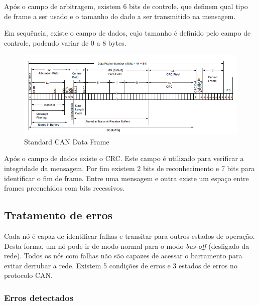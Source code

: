 Após o campo de arbitragem, existem 6 bits de controle, que definem qual tipo de frame a ser usado e o tamanho do dado a ser transmitido na mensagem. 

Em sequência, existe o campo de dados, cujo tamanho é definido pelo campo de controle, podendo variar de 0 a 8 bytes. 

\begin{figure}[H]
\centering
\includegraphics[width=\textwidth]{imagens/DataFrame}
\caption{Standard CAN Data Frame \cite{cip3}}
\label{im::candataframe}
\end{figure}

Após o campo de dados existe o CRC. Este campo é utilizado para verificar a integridade da mensagem. Por fim existem 2 bits de reconhecimento e 7 bits para identificar o fim de frame. Entre uma mensagem e outra existe um espaço entre frames preenchidos com bits recessivos.

\subsection{Tratamento de erros}

Cada nó é capaz de identificar falhas e transitar para outros estados de operação. Desta forma, um nó pode ir de modo normal para o modo {\it bus-off} (desligado da rede). Todos os nós com falhas não são capazes de acessar o barramento para evitar derrubar a rede. Existem 5 condições de erros e 3 estados de erros no protocolo CAN.

\subsubsection{Erros detectados}

